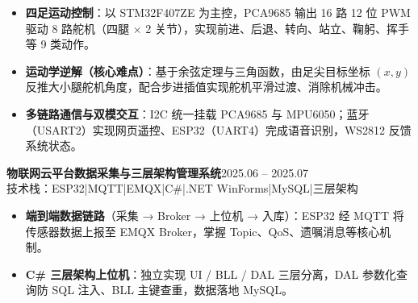 \documentclass[10pt,a4paper]{article}
\newcommand{\projectblock}[3]{%
    {\bfseries\color{darktext}#1}\hfill{\color{graytext}#2}\\%
    {\small\color{graytext}#3}%
    \vspace{0.2em}%
}
\begin{document}
\begin{itemize}[leftmargin=1.5em, itemsep=2pt, parsep=0pt, topsep=2pt]
    \item \textbf{四足运动控制}：以 STM32F407ZE 为主控，PCA9685 输出 16 路 12 位 PWM 驱动 8 路舵机（四腿 $\times$ 2 关节），实现前进、后退、转向、站立、鞠躬、挥手等 9 类动作。
    \item \textbf{运动学逆解（核心难点）}：基于余弦定理与三角函数，由足尖目标坐标 $(x, y)$ 反推大小腿舵机角度，配合步进插值实现舵机平滑过渡、消除机械冲击。
    \item \textbf{多链路通信与双模交互}：I2C 统一挂载 PCA9685 与 MPU6050；蓝牙（USART2）实现网页遥控、ESP32（UART4）完成语音识别，WS2812 反馈系统状态。
\end{itemize}

\vspace{0.15em}

\projectblock{物联网云平台数据采集与三层架构管理系统}{2025.06 -- 2025.07}{技术栈：ESP32\hspace{0.3em}|\hspace{0.3em}MQTT\hspace{0.3em}|\hspace{0.3em}EMQX\hspace{0.3em}|\hspace{0.3em}C\#\hspace{0.3em}|\hspace{0.3em}.NET WinForms\hspace{0.3em}|\hspace{0.3em}MySQL\hspace{0.3em}|\hspace{0.3em}三层架构}

\begin{itemize}[leftmargin=1.5em, itemsep=2pt, parsep=0pt, topsep=2pt]
    \item \textbf{端到端数据链路}（采集 → Broker → 上位机 → 入库）：ESP32 经 MQTT 将传感器数据上报至 EMQX Broker，掌握 Topic、QoS、遗嘱消息等核心机制。
    \item \textbf{C\# 三层架构上位机}：独立实现 UI / BLL / DAL 三层分离，DAL 参数化查询防 SQL 注入、BLL 主键查重，数据落地 MySQL。
\end{itemize}

\vspace{0.15em}
\end{document}
